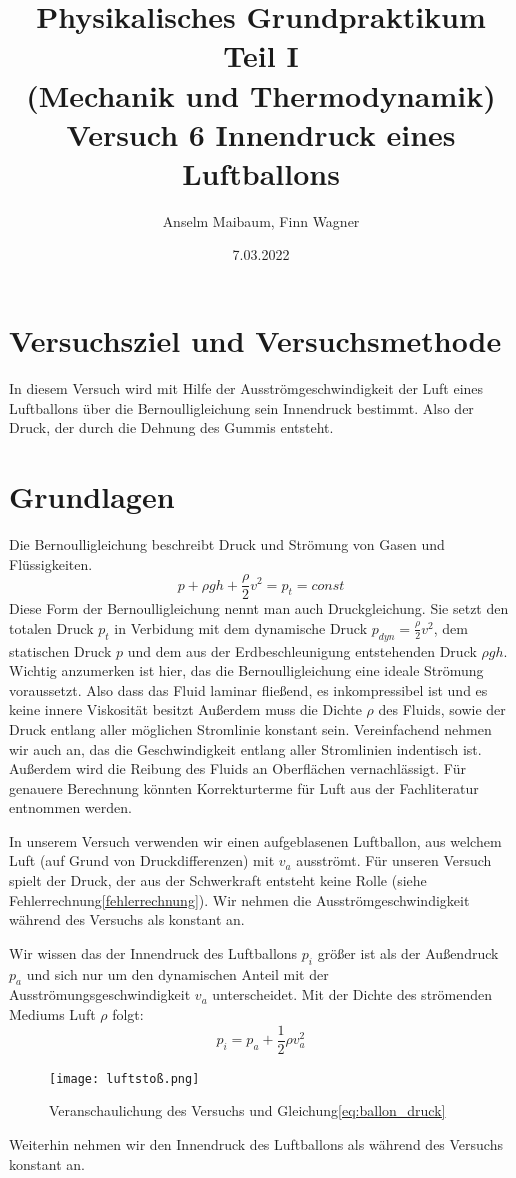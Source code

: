 \documentclass{article}
\date{7.03.2022}
\title{Physikalisches Grundpraktikum Teil I \\ (Mechanik und Thermodynamik) \\ Versuch 6 Innendruck eines Luftballons}
\author{Anselm Maibaum, Finn Wagner}
\begin{document}
    \maketitle

    \section{Versuchsziel und Versuchsmethode}
    In diesem Versuch wird mit Hilfe der Ausströmgeschwindigkeit der Luft eines Luftballons über die Bernoulligleichung sein Innendruck bestimmt.
    Also der Druck, der durch die Dehnung des Gummis entsteht.

    \section{Grundlagen}
    Die Bernoulligleichung beschreibt Druck und Strömung von Gasen und Flüssigkeiten.
    \begin{equation} \label{eq:bernoulli}
        p + \rho g h + \frac{\rho}{2} v^2 = p_t = const
    \end{equation}
    Diese Form der Bernoulligleichung nennt man auch Druckgleichung.
    Sie setzt den totalen Druck \( p_t \) in Verbidung mit dem dynamische Druck \(p_{dyn} = \frac{\rho}{2} v^2\), 
    dem statischen Druck \( p \) und dem aus der Erdbeschleunigung entstehenden Druck \( \rho g h  \).
    Wichtig anzumerken ist hier, das die Bernoulligleichung eine ideale Strömung voraussetzt.
    Also dass das Fluid laminar fließend, es inkompressibel ist und es keine innere Viskosität besitzt 
    Außerdem muss die Dichte \( \rho \) des Fluids, sowie der Druck entlang aller möglichen Stromlinie konstant sein.
    Vereinfachend nehmen wir auch an, das die Geschwindigkeit entlang aller Stromlinien indentisch ist\cite{Aufgabenstellung}.
    Außerdem wird die Reibung des Fluids an Oberflächen vernachlässigt.
    Für genauere Berechnung könnten Korrekturterme für Luft aus der Fachliteratur entnommen werden.

    In unserem Versuch verwenden wir einen aufgeblasenen Luftballon, aus welchem Luft (auf Grund von Druckdifferenzen) mit \(v_a\) ausströmt.
    Für unseren Versuch spielt der Druck, der aus der Schwerkraft entsteht keine Rolle (siehe Fehlerrechnung\ref{fehlerrechnung}).
    Wir nehmen die Ausströmgeschwindigkeit während des Versuchs als konstant an.
    
    Wir wissen das der Innendruck des Luftballons \(p_i\) größer ist als der Außendruck \(p_a\)
    und sich nur um den dynamischen Anteil mit der Ausströmungsgeschwindigkeit \(v_a\) unterscheidet.
    Mit der Dichte des strömenden Mediums Luft \( \rho \) folgt: 
    \begin{equation} \label{eq:ballon_druck}
        p_i = p_a + \frac{1}{2} \rho v_a^2
    \end{equation}
    \begin{figure}[h]\label{fig:luftstoss}
        \centering
        \texttt{[image: luftstoß.png]}
        \caption{Veranschaulichung des Versuchs und Gleichung\ref{eq:ballon_druck}}
    \end{figure}
    Weiterhin nehmen wir den Innendruck des Luftballons als während des Versuchs konstant an.
\end{document}
